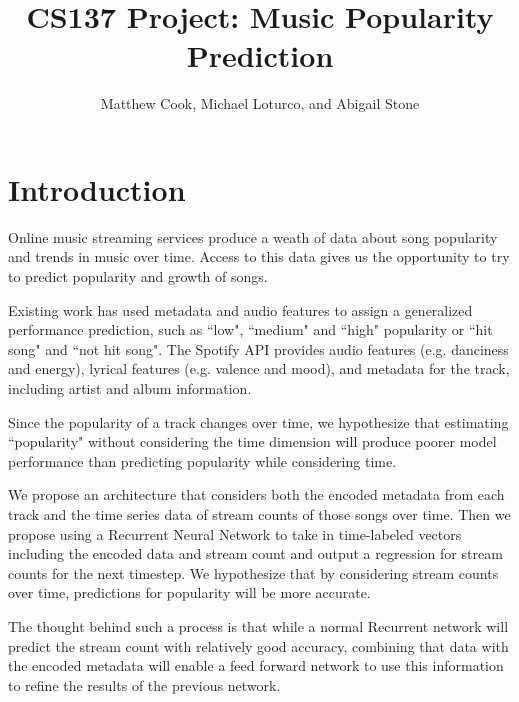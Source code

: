 \documentclass[11pt]{article}
\title{CS137 Project: Music Popularity Prediction}
\author{Matthew Cook, Michael Loturco, and Abigail Stone}
\date{}
\begin{document}
\maketitle

\section{Introduction}

Online music streaming services produce a weath of data about song popularity and trends in music over time. Access to this data gives us the opportunity to try to predict popularity and growth of songs. 

Existing work \cite{araujo_predicting_2019, martin-gutierrez_multimodal_2020} has used metadata and audio features to assign a generalized performance prediction, such as ``low", ``medium" and ``high" popularity or ``hit song" and ``not hit song". The Spotify API \cite{noauthor_spotify_nodate} provides audio features (e.g. danciness and energy), lyrical features (e.g. valence and mood), and metadata for the track, including artist and album information.


Since the popularity of a track changes over time, we hypothesize that estimating ``popularity" without considering the time dimension will produce poorer model performance than predicting popularity while considering time. 

We propose an architecture that considers both the encoded metadata from each track and the time series data of stream counts of those songs over time. Then we propose using a Recurrent Neural Network to take in time-labeled vectors including the encoded data and stream count and output a regression for stream counts for the next timestep. We hypothesize that by considering stream counts over time, predictions for popularity will be more accurate. 

The thought behind such a process is that while a normal Recurrent network will predict the stream count with relatively good accuracy, combining that data with the encoded metadata will enable a feed forward network to use this information to refine the results of the previous network.
\end{document}
